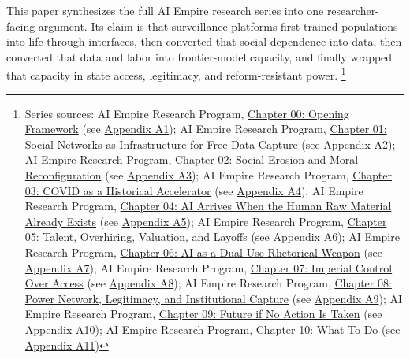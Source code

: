 \documentclass[
  american,
  11pt,
  letterpaper,
]{article}
\begin{document}
This paper synthesizes the full AI Empire research series into one
researcher-facing argument. Its claim is that surveillance platforms
first trained populations into life through interfaces, then converted
that social dependence into data, then converted that data and labor
into frontier-model capacity, and finally wrapped that capacity in state
access, legitimacy, and reform-resistant power. \footnote{Series
  sources: AI Empire Research Program,
  \href{00_opening-framework_paper.html}{Chapter 00: Opening Framework}
  (see \hyperref[appendix-a1-chapter-00-opening-framework]{Appendix
  A1}); AI Empire Research Program,
  \href{01_social-networks-data-capture_paper.html}{Chapter 01: Social
  Networks as Infrastructure for Free Data Capture} (see
  \hyperref[appendix-a2-chapter-01-social-networks-as-infrastructure-for-free-data-capture]{Appendix
  A2}); AI Empire Research Program,
  \href{02_social-erosion-and-moral-reconfiguration_paper.html}{Chapter
  02: Social Erosion and Moral Reconfiguration} (see
  \hyperref[appendix-a3-chapter-02-social-erosion-and-moral-reconfiguration]{Appendix
  A3}); AI Empire Research Program,
  \href{03_covid-historical-accelerator_paper.html}{Chapter 03: COVID as
  a Historical Accelerator} (see
  \hyperref[appendix-a4-chapter-03-covid-as-a-historical-accelerator]{Appendix
  A4}); AI Empire Research Program,
  \href{04_data-models-weights_paper.html}{Chapter 04: AI Arrives When
  the Human Raw Material Already Exists} (see
  \hyperref[appendix-a5-chapter-04-ai-arrives-when-the-human-raw-material-already-exists]{Appendix
  A5}); AI Empire Research Program,
  \href{05_talent-overhiring-layoffs_paper.html}{Chapter 05: Talent,
  Overhiring, Valuation, and Layoffs} (see
  \hyperref[appendix-a6-chapter-05-talent-overhiring-valuation-and-layoffs]{Appendix
  A6}); AI Empire Research Program,
  \href{06_dual-use-rhetorical-weapon_paper.html}{Chapter 06: AI as a
  Dual-Use Rhetorical Weapon} (see
  \hyperref[appendix-a7-chapter-06-ai-as-a-dual-use-rhetorical-weapon]{Appendix
  A7}); AI Empire Research Program,
  \href{07_imperial-control-over-access_paper.html}{Chapter 07: Imperial
  Control Over Access} (see
  \hyperref[appendix-a8-chapter-07-imperial-control-over-access]{Appendix
  A8}); AI Empire Research Program,
  \href{08_legitimacy-and-institutional-capture_paper.html}{Chapter 08:
  Power Network, Legitimacy, and Institutional Capture} (see
  \hyperref[appendix-a9-chapter-08-power-network-legitimacy-and-institutional-capture]{Appendix
  A9}); AI Empire Research Program,
  \href{09_future-if-unchecked_paper.html}{Chapter 09: Future if No
  Action Is Taken} (see
  \hyperref[appendix-a10-chapter-09-future-if-no-action-is-taken]{Appendix
  A10}); AI Empire Research Program,
  \href{10_three-reform-program_paper.html}{Chapter 10: What To Do} (see
  \hyperref[appendix-a11-chapter-10-what-to-do]{Appendix A11})}
\end{document}
